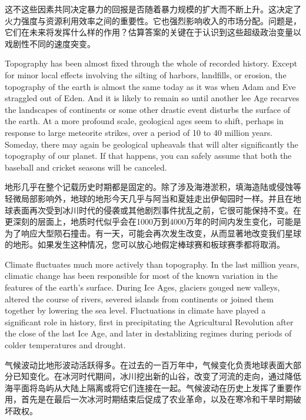 \begin{Parallel}{97mm}{72mm}
  \ParallelRText
  {这不这些因素共同决定暴力的回报是否随着暴力规模的扩大而不断上升。这决定了火力强度与资源利用效率之间的重要性。它也强烈影响收入的市场分配。问题是，它们在未来将发挥什么样的作用？估算答案的关键在于认识到这些超级政治变量以戏剧性不同的速度突变。}
  \ParallelPar



  \ParallelLText
  {Topography has been almost fixed through the whole of recorded history. Except for minor local effects involving the silting of harbors, landfills, or erosion, the topography of the earth is almost the same today as it was when Adam and Eve straggled out of Eden. And it is likely to remain so until another lee Age recarves the landscapes of continents or some other drastic event disturbs the surface of the earth. At a more profound scale, geological ages seem to shift, perhaps in response to large meteorite strikes, over a period of 10 to 40 million years. Someday, there may again be geological upheavals that will alter significantly the topography of our planet. If that happens, you can safely assume that both the baseball and cricket seasons will be canceled.}
  
  \ParallelRText
  {地形几乎在整个记载历史时期都是固定的。除了涉及海港淤积，填海造陆或侵蚀等轻微局部影响外，地球的地形今天几乎与阿当和夏娃走出伊甸园时一样。并且在地球表面再次受到冰川时代的侵袭或其他剧烈事件扰乱之前，它很可能保持不变。在更深刻的层面上，地质时代似乎会在1000万到4000万年的时间内发生变化，可能是为了响应大型陨石撞击。有一天，可能会再次发生改变，从而显著地改变我们星球的地形。如果发生这种情况，您可以放心地假定棒球赛和板球赛季都将取消。}
  \ParallelPar


  \ParallelLText
  {Climate fluctuates much more actively than topography. In the last million years, climatic change has been responsible for most of the known variation in the features of the earth's surface. During Ice Ages, glaciers gouged new valleys, altered the course of rivers, severed islands from continents or joined them together by lowering the sea level. Fluctuations in climate have played a significant role in history, first in precipitating the Agricultural Revolution after the close of the last Ice Age, and later in destablizing regimes during periods of colder temperatures and drought.}
  
  \ParallelRText
  {气候波动比地形波动活跃得多。在过去的一百万年中，气候变化负责地球表面大部分已知变化。在冰河时代期间，冰川挖出新的山谷，改变了河流的走向，通过降低海平面将岛屿从大陆上隔离或将它们连接在一起。气候波动在历史上发挥了重要作用，首先是在最后一次冰河时期结束后促成了农业革命，以及在寒冷和干旱时期破坏政权。}
  \ParallelPar



\end{Parallel}
